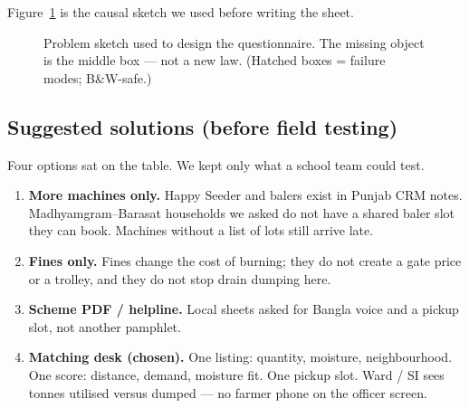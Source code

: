 \documentclass[12pt,a4paper]{article}
\begin{document}
Figure~\ref{fig:problem} is the causal sketch we used before writing the sheet.

\begin{figure}[h]
\centering
{}
\caption{Problem sketch used to design the questionnaire. The missing object is the middle box --- not a new law. (Hatched boxes = failure modes; B\&W-safe.)}
\label{fig:problem}
\end{figure}

\subsection{Suggested solutions (before field testing)}
Four options sat on the table. We kept only what a school team could test.

\begin{enumerate}
  \item \textbf{More machines only.} Happy Seeder and balers exist in Punjab CRM notes. Madhyamgram--Barasat households we asked do not have a shared baler slot they can book. Machines without a list of lots still arrive late.
  \item \textbf{Fines only.} Fines change the cost of burning; they do not create a gate price or a trolley, and they do not stop drain dumping here.
  \item \textbf{Scheme PDF / helpline.} Local sheets asked for Bangla voice and a pickup slot, not another pamphlet.
  \item \textbf{Matching desk (chosen).} One listing: quantity, moisture, neighbourhood. One score: distance, demand, moisture fit. One pickup slot. Ward / SI sees tonnes utilised versus dumped --- no farmer phone on the officer screen.
\end{enumerate}
\end{document}
